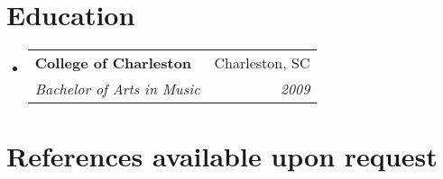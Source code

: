 \documentclass[letterpaper,11pt]{article}
\makeatletter
\newcommand{\resumeSubheading}[4]{
  \vspace{-1pt}\item
    \begin{tabular*}{0.97\textwidth}{l@{\extracolsep{\fill}}r}
      \textbf{#1} & #2 \\
      \textit{\small#3} & \textit{\small #4} \\
    \end{tabular*}\vspace{-5pt}
}
\newcommand{\resumeSubHeadingListStart}{\begin{itemize}[leftmargin=*]}
\newcommand{\resumeSubHeadingListEnd}{\end{itemize}}
\makeatother
\begin{document}
\section{Education}
  \resumeSubHeadingListStart
    \resumeSubheading
      {College of Charleston}{Charleston, SC}
      {Bachelor of Arts in Music}{2009}
  \resumeSubHeadingListEnd

\section{References available upon request}
\end{document}
